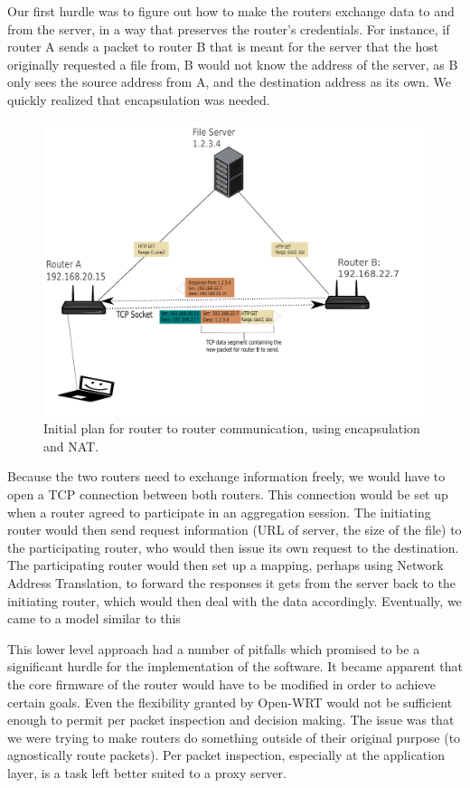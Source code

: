 \documentclass[12pt]{article}
\begin{document}
		Our first hurdle was to figure out how to make the routers exchange data to and from the server, in a way that preserves the router's credentials. For instance, if router A sends a packet to router B that is meant for the server that the host originally requested a file from, B would not know the address of the server, as B only sees the source address from A, and the destination address as its own. We quickly realized that encapsulation was needed. 

		\begin{figure}[H]
			\centering
			\includegraphics[keepaspectratio=true,scale=0.08]{RouterDiagram.png}
			\caption{Initial plan for router to router communication, using encapsulation and NAT.}
		\end{figure}

		Because the two routers need to exchange information freely, we would have to open a TCP connection between both routers. This connection would be set up when a router agreed to participate in an aggregation session. The initiating router would then send request information (URL of server, the size of the file) to the participating router, who would then issue its own request to the destination. The participating router would then set up a mapping, perhaps using Network Address Translation, to forward the responses it gets from the server back to the initiating router, which would then deal with the data accordingly. Eventually, we came to a model similar to this

		This lower level approach had a number of pitfalls which promised to be a significant hurdle for the implementation of the software. It became apparent that the core firmware of the router would have to be modified in order to achieve certain goals. Even the flexibility granted by Open-WRT would not be sufficient enough to permit per packet inspection and decision making. The issue was that we were trying to make routers do something outside of their original purpose (to agnostically route packets). Per packet inspection, especially at the application layer, is a task left better suited to a proxy server.
\end{document}
